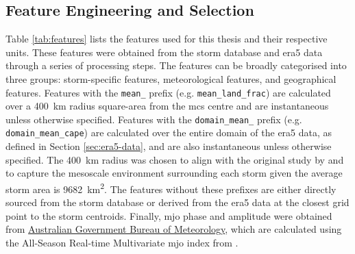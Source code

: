 \subsection{Feature Engineering and Selection}

Table \ref{tab:features} lists the features used for this thesis and their respective units. These features were obtained from the \cite{Hill2023} storm database and \acrshort{era5} data through a series of processing steps. The features can be broadly categorised into three groups: storm-specific features, meteorological features, and geographical features. Features with the \texttt{mean\_} prefix (e.g. \texttt{mean\_land\_frac}) are calculated over a \SI{400}{\km} radius square-area from the \acrshort{mcs} centre and are instantaneous unless otherwise specified. Features with the \texttt{domain\_mean\_} prefix (e.g. \texttt{domain\_mean\_cape}) are calculated over the entire domain of the \acrshort{era5} data, as defined in Section \ref{sec:era5-data}, and are also instantaneous unless otherwise specified. The \SI{400}{\km} radius was chosen to align with the original study by \cite{Hunt2024} and to capture the mesoscale environment surrounding each storm given the average storm area is \SI{9682}{\km\squared}. The features without these prefixes are either directly sourced from the storm database or derived from the \acrshort{era5} data at the closest grid point to the storm centroids. Finally, \acrfull{mjo} phase and amplitude were obtained from \href{https://www.bom.gov.au/climate/mjo/}{Australian Government Bureau of Meteorology}, which are calculated using the All-Season Real-time Multivariate \acrshort{mjo} index from \cite{Wheeler2004}.

